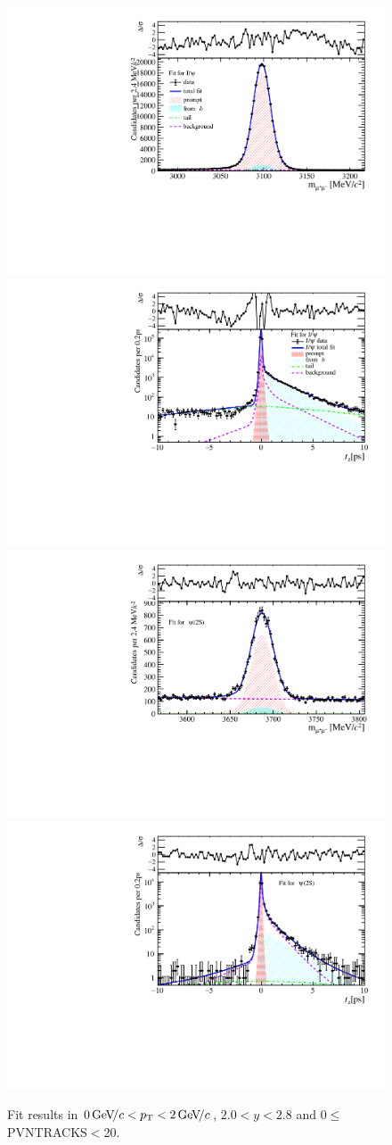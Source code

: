 \begin{figure}[H]
\begin{center}
\includegraphics[width=0.47\linewidth]{pdf/Jpsi/drawmass/n1y1pt1.pdf}
\includegraphics[width=0.47\linewidth]{pdf/Jpsi/2DFit/n1y1pt1.pdf}
\vspace*{-0.5cm}
\includegraphics[width=0.47\linewidth]{pdf/Psi2S/drawmass/n1y1pt1.pdf}
\includegraphics[width=0.47\linewidth]{pdf/Psi2S/2DFit/n1y1pt1.pdf}
\vspace*{-0.5cm}
\end{center}
\caption{Fit results in $0\text{\,Ge\kern -0.1em V\!/}c<p_{\mathrm{T}}<2\text{\,Ge\kern -0.1em V\!/}c$, $2.0<y<2.8$ and 0$\leq$PVNTRACKS$<$20.}
\label{Fitn1y1pt1}
\end{figure}
